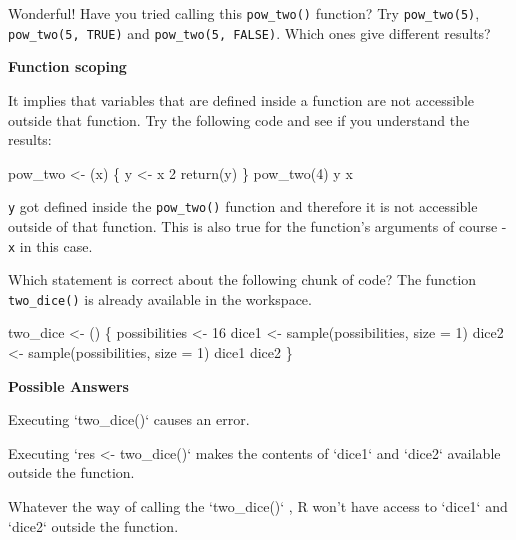 \documentclass[]{article}
\newcommand{\hlnum}[1]{\textcolor[rgb]{0.816,0.125,0.439}{#1}}%
\newcommand{\hlstr}[1]{\textcolor[rgb]{0.251,0.627,0.251}{#1}}%
\newcommand{\hlstd}[1]{\textcolor[rgb]{0.251,0.251,0.251}{#1}}%
\newcommand{\hlkwc}[1]{\textcolor[rgb]{0.251,0.251,0.251}{#1}}%
\newcommand{\hlkwd}[1]{\textcolor[rgb]{0.878,0.439,0.125}{#1}}%
\newenvironment{Shaded}{\begin{myshaded}}{\end{myshaded}}
\newcommand{\KeywordTok}[1]{\hlkwd{#1}}
\newcommand{\DataTypeTok}[1]{\hlkwc{#1}}
\newcommand{\DecValTok}[1]{\hlnum{#1}}
\newcommand{\StringTok}[1]{\hlstr{#1}}
\newcommand{\NormalTok}[1]{\hlstd{#1}}
\begin{document}
Wonderful! Have you tried calling this \texttt{pow\_two()} function? Try
\texttt{pow\_two(5)}, \texttt{pow\_two(5,\ TRUE)} and
\texttt{pow\_two(5,\ FALSE)}. Which ones give different results?

\textbf{Function scoping}

It implies that variables that are defined inside a function are not
accessible outside that function. Try the following code and see if you
understand the results:

\begin{Shaded}
\begin{Highlighting}[]
\NormalTok{pow_two <-}\StringTok{ }\NormalTok{(x) \{}
\NormalTok{y <-}\StringTok{ }\NormalTok{x }\OperatorTok{^}\StringTok{ }\DecValTok{2}
\KeywordTok{return}\NormalTok{(y)}
\NormalTok{\}}
\KeywordTok{pow_two}\NormalTok{(}\DecValTok{4}\NormalTok{)}
\NormalTok{y}
\NormalTok{x}
\end{Highlighting}
\end{Shaded}

\texttt{y} got defined inside the \texttt{pow\_two()} function and
therefore it is not accessible outside of that function. This is also
true for the function's arguments of course - \texttt{x} in this case.

Which statement is correct about the following chunk of code? The
function \texttt{two\_dice()} is already available in the workspace.

\begin{Shaded}
\begin{Highlighting}[]
\NormalTok{two_dice <-}\StringTok{ }\NormalTok{() \{}
\NormalTok{possibilities <-}\StringTok{ }\DecValTok{1}\OperatorTok{:}\DecValTok{6}
\NormalTok{dice1 <-}\StringTok{ }\KeywordTok{sample}\NormalTok{(possibilities, }\DataTypeTok{size =} \DecValTok{1}\NormalTok{)}
\NormalTok{dice2 <-}\StringTok{ }\KeywordTok{sample}\NormalTok{(possibilities, }\DataTypeTok{size =} \DecValTok{1}\NormalTok{)}
\NormalTok{dice1 }\OperatorTok{+}\StringTok{ }\NormalTok{dice2}
\NormalTok{\}}
\end{Highlighting}
\end{Shaded}

\textbf{Possible Answers}

\begin{Shaded}
\begin{Highlighting}[]
\OperatorTok{*}\StringTok{ }\NormalTok{Executing }\StringTok{`}\DataTypeTok{two_dice()}\StringTok{`}\NormalTok{ causes an error.}

\OperatorTok{*}\StringTok{ }\NormalTok{Executing }\StringTok{`}\DataTypeTok{res <- two_dice()}\StringTok{`}\NormalTok{ makes the contents of }\StringTok{`}\DataTypeTok{dice1}\StringTok{`}\NormalTok{ and }\StringTok{`}\DataTypeTok{dice2}\StringTok{`}\NormalTok{ available outside the function.}

\OperatorTok{*}\StringTok{ }\NormalTok{Whatever the way of calling the }\StringTok{`}\DataTypeTok{two_dice()}\StringTok{`} \NormalTok{, R won}\StringTok{'t have access to `dice1` and `dice2` outside the function.}
\end{Highlighting}
\end{Shaded}
\end{document}
